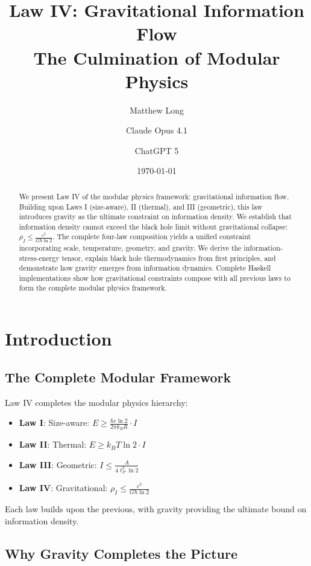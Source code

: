 \documentclass[11pt,a4paper]{article}
\title{Law IV: Gravitational Information Flow\\[0.5em]
\large The Culmination of Modular Physics}
\author[1]{Matthew Long}
\author[2]{Claude Opus 4.1}
\author[3]{ChatGPT 5}
\affil[1]{YonedaAI}
\affil[2]{Anthropic}
\affil[3]{OpenAI}
\date{\today}
\theoremstyle{definition}
\begin{document}
\maketitle

\begin{abstract}
We present Law IV of the modular physics framework: gravitational information flow. Building upon Laws I (size-aware), II (thermal), and III (geometric), this law introduces gravity as the ultimate constraint on information density. We establish that information density cannot exceed the black hole limit without gravitational collapse: $\rho_I \leq \frac{c^3}{G\hbar \ln 2}$. The complete four-law composition yields a unified constraint incorporating scale, temperature, geometry, and gravity. We derive the information-stress-energy tensor, explain black hole thermodynamics from first principles, and demonstrate how gravity emerges from information dynamics. Complete Haskell implementations show how gravitational constraints compose with all previous laws to form the complete modular physics framework.
\end{abstract}

\tableofcontents

\section{Introduction}

\subsection{The Complete Modular Framework}

Law IV completes the modular physics hierarchy:

\begin{itemize}
\item \textbf{Law I}: Size-aware: $E \geq \frac{\hbar c \ln 2}{2\pi k_B R} \cdot I$
\item \textbf{Law II}: Thermal: $E \geq k_B T \ln 2 \cdot I$
\item \textbf{Law III}: Geometric: $I \leq \frac{A}{4\ell_P^2 \ln 2}$
\item \textbf{Law IV}: Gravitational: $\rho_I \leq \frac{c^3}{G\hbar \ln 2}$
\end{itemize}

Each law builds upon the previous, with gravity providing the ultimate bound on information density.

\subsection{Why Gravity Completes the Picture}
\end{document}
